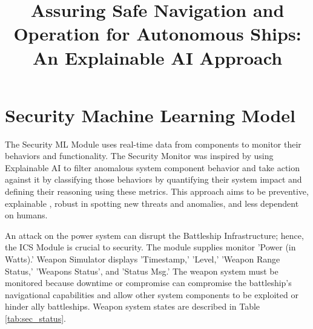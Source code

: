 \documentclass[conference]{IEEEtran}
\begin{document}
\title{Assuring Safe Navigation and Operation for Autonomous Ships: An Explainable AI Approach}

\author{
\IEEEauthorblockA{\textit{} \\
\textit{}\\
 \\
}
\and
{}
\IEEEauthorblockA{\textit{} \\
\textit{}\\
 \\
}
\and
{}
\IEEEauthorblockA{\textit{} \\
\textit{}\\
 \\
}
\and
{}
\IEEEauthorblockA{\textit{} \\
\textit{}\\
 \\
}
\and
{}
\IEEEauthorblockA{\textit{} \\
\textit{}\\
 \\
}
\and
{}
\IEEEauthorblockA{\textit{} \\
\textit{}\\
}}


\section{Security Machine Learning Model}
The Security ML Module uses real-time data from components to monitor their behaviors and functionality. The Security Monitor was inspired by using Explainable AI to filter anomalous system component behavior and take action against it by classifying those behaviors by quantifying their system impact and defining their reasoning using these metrics. This approach aims to be preventive, explainable \cite{b5}, robust in spotting new threats and anomalies, and less dependent on humans.

An attack on the power system can disrupt the Battleship Infrastructure; hence, the ICS Module is crucial to security. The module supplies monitor 'Power (in Watts).'
Weapon Simulator displays 'Timestamp,' 'Level,' 'Weapon Range Status,' 'Weapons Status', and 'Status Msg.' The weapon system must be monitored because downtime or compromise can compromise the battleship's navigational capabilities and allow other system components to be exploited or hinder ally battleships. Weapon system states are described in Table \ref{tab:sec_status}.
\end{document}
